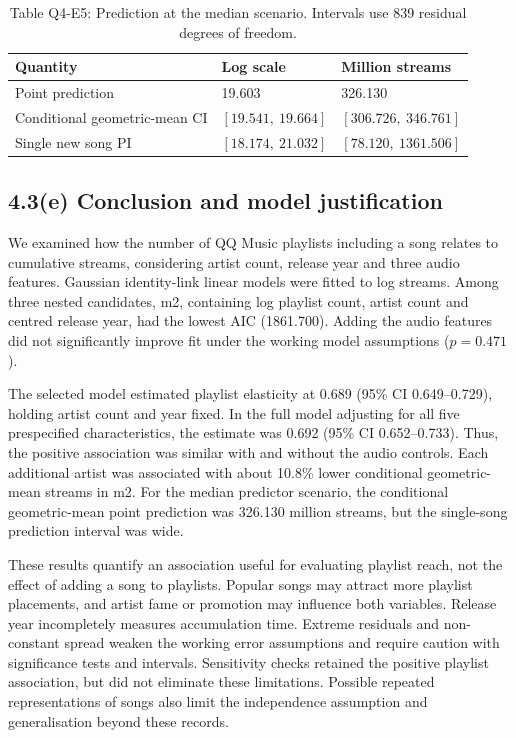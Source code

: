 \begin{table}[htbp]\centering\small
\caption*{Table Q4-E5: Prediction at the median scenario. Intervals use 839 residual degrees of freedom.}
\begin{tabular}{lll}\toprule
Quantity & Log scale & Million streams \\\midrule
Point prediction & 19.603 & 326.130 \\
Conditional geometric-mean CI & $[19.541,\ 19.664]$ & $[306.726,\ 346.761]$ \\
Single new song PI & $[18.174,\ 21.032]$ & $[78.120,\ 1361.506]$ \\\bottomrule
\end{tabular}\end{table}

\FloatBarrier
\subsection*{4.3(e) Conclusion and model justification}

We examined how the number of QQ Music playlists including a song relates to cumulative streams, considering artist count, release year and three audio features. Gaussian identity-link linear models were fitted to log streams. Among three nested candidates, m2, containing log playlist count, artist count and centred release year, had the lowest AIC (1861.700). Adding the audio features did not significantly improve fit under the working model assumptions ($p=0.471$).

The selected model estimated playlist elasticity at 0.689 (95\% CI 0.649--0.729), holding artist count and year fixed. In the full model adjusting for all five prespecified characteristics, the estimate was 0.692 (95\% CI 0.652--0.733). Thus, the positive association was similar with and without the audio controls. Each additional artist was associated with about 10.8\% lower conditional geometric-mean streams in m2. For the median predictor scenario, the conditional geometric-mean point prediction was 326.130 million streams, but the single-song prediction interval was wide.

These results quantify an association useful for evaluating playlist reach, not the effect of adding a song to playlists. Popular songs may attract more playlist placements, and artist fame or promotion may influence both variables. Release year incompletely measures accumulation time. Extreme residuals and non-constant spread weaken the working error assumptions and require caution with significance tests and intervals. Sensitivity checks retained the positive playlist association, but did not eliminate these limitations. Possible repeated representations of songs also limit the independence assumption and generalisation beyond these records.
